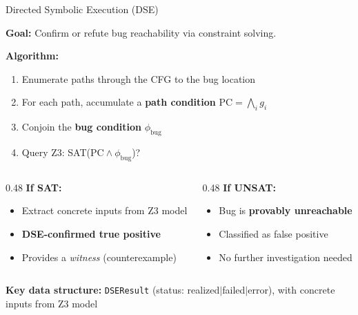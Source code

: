 \documentclass[aspectratio=169]{beamer}
\begin{document}
\begin{frame}{Directed Symbolic Execution (DSE)}

\textbf{Goal:} Confirm or refute bug reachability via constraint solving.

\vspace{0.5em}
\textbf{Algorithm:}
\begin{enumerate}
  \item Enumerate paths through the CFG to the bug location
  \item For each path, accumulate a \textbf{path condition} $\text{PC} = \bigwedge_i g_i$
  \item Conjoin the \textbf{bug condition} $\phi_{\text{bug}}$
  \item Query Z3: SAT($\text{PC} \land \phi_{\text{bug}}$)?
\end{enumerate}

\vspace{0.5em}
\begin{columns}[T]
\begin{column}{0.48\textwidth}
\textbf{If SAT:}
\begin{itemize}
  \item Extract concrete inputs from Z3 model
  \item \textbf{DSE-confirmed true positive}
  \item Provides a \emph{witness} (counterexample)
\end{itemize}
\end{column}
\begin{column}{0.48\textwidth}
\textbf{If UNSAT:}
\begin{itemize}
  \item Bug is \textbf{provably unreachable}
  \item Classified as false positive
  \item No further investigation needed
\end{itemize}
\end{column}
\end{columns}

\vspace{0.3em}
\textbf{Key data structure:} \texttt{DSEResult} (status: realized$|$failed$|$error), with concrete inputs from Z3 model

\end{frame}
\end{document}
